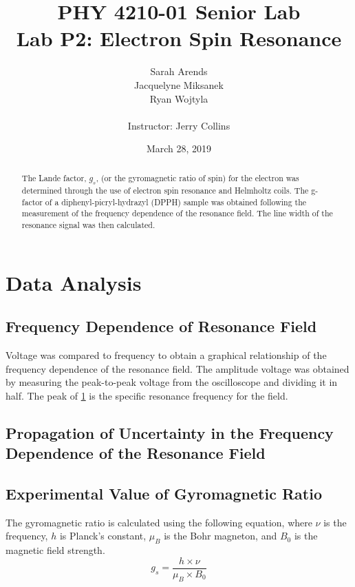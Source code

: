 \documentclass[a4paper]{article}
\title{PHY 4210-01 Senior Lab \\Lab P2: Electron Spin Resonance}
\author{Sarah Arends \\ 
        Jacquelyne Miksanek \\
        Ryan Wojtyla \\ \\
        Instructor: Jerry Collins}
\date{March 28, 2019}
\begin{document}
\maketitle 

\begin{abstract}

\qq The Lande factor, $g_s$, (or the gyromagnetic ratio of spin) for the
electron was determined through the use of electron spin resonance and
Helmholtz coils. The g-factor of a diphenyl-picryl-hydrazyl (DPPH) sample was
obtained following the measurement of the frequency dependence of the
resonance field. The line width of the resonance signal was then calculated.

\end{abstract}

\newpage

\tableofcontents

\newpage

\section{Data Analysis}
\subsection{Frequency Dependence of Resonance Field}

\qq Voltage was compared to frequency to obtain a graphical
relationship of the frequency dependence of the resonance field. The
amplitude voltage was obtained by measuring the peak-to-peak voltage
from the oscilloscope and dividing it in half. The peak of
\ref{FrequencyDependence} is the specific resonance frequency for the field.
\begin{figure}[H]
\centering
\label{FrequencyDependence}
\end{figure}

\subsection{Propagation of Uncertainty in the Frequency Dependence of the Resonance Field}

\subsection{Experimental Value of Gyromagnetic Ratio}
\qq The gyromagnetic ratio is calculated using the following equation, where $\nu$ is the frequency, $h$ is Planck's constant, $\mu_B$ is the Bohr magneton, and $B_0$ is the magnetic field strength.
\begin{equation}
\label{eq:exp_gs}
g_s = \frac{h \times \nu}{\mu_B \times B_0}
\end{equation} 
\end{document}
